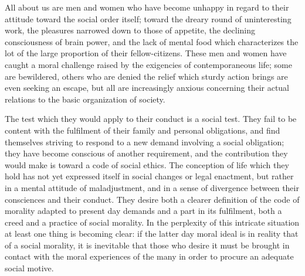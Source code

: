 \documentclass[]{article}
\begin{document}
\begin{sectionbody}
\addamsparagraph All about us are men and women who have become unhappy in regard to
their attitude toward the social order itself; toward the dreary round
of uninteresting work, the pleasures narrowed down to those of appetite,
the declining consciousness of brain power, and the lack of mental food
which characterizes the lot of the large proportion of their
fellow-citizens. These men and women have caught a moral challenge
raised by the exigencies of contemporaneous life; some are bewildered,
others who are denied the relief which sturdy action brings are even
seeking an escape, but all are increasingly anxious concerning their
actual relations to the basic organization of society.

\addamsparagraph The test which they would apply to their conduct is a social test. They
fail to be content with the fulfilment of their family and personal
obligations, and find themselves striving to respond to a new demand
involving a social obligation; they have become conscious of another
requirement, and the contribution they would make is toward a code of
social ethics. The conception of life which they hold has not yet
expressed itself in social changes or legal enactment, but rather in a
mental attitude of maladjustment, and in a sense of divergence between
their consciences and their conduct. They desire both a clearer
definition of the code of morality adapted to present day demands and a
part in its fulfilment, both a creed and a practice of social morality.
In the perplexity of this intricate situation at least one thing is
becoming clear: if the latter day moral ideal is in reality that of a
social morality, it is inevitable that those who desire it must be
brought in contact with the moral experiences of the many in order to
procure an adequate social motive.


\end{sectionbody}
\end{document}
